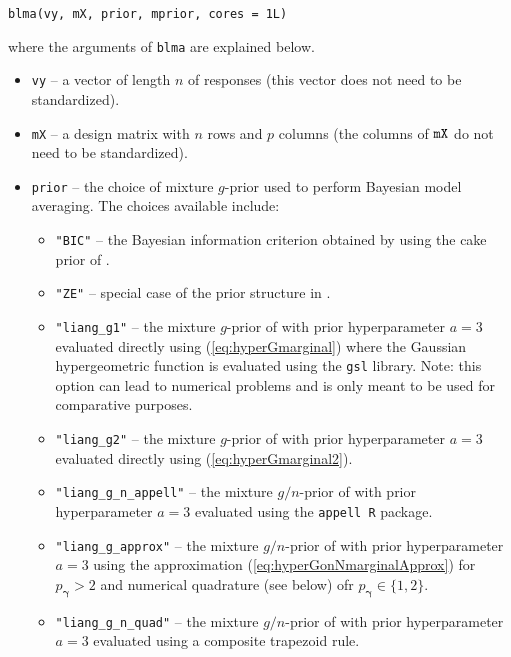\documentclass[12pt]{article}
\def\vectorfonttwo{\boldsymbol}
\def\vgamma{{\vectorfonttwo \gamma}}             %
\begin{document}
\begin{verbatim}
blma(vy, mX, prior, mprior, cores = 1L)
\end{verbatim}

\noindent where the arguments of {\tt blma}
are explained below.
\begin{itemize}
	\item {\tt vy} -- a vector of length $n$ of responses (this vector does not need to be standardized).
	
	\item {\tt mX} -- a design matrix with $n$ rows and $p$ columns (the columns of ${\tt mX}$ do not need to be standardized).
	
	\item {\tt prior} -- the choice of mixture $g$-prior used to perform Bayesian model averaging. The choices available include:
	\begin{itemize}
		\item {\tt "BIC"} -- the Bayesian information criterion obtained by using the cake prior 
		of \cite{OrmerodEtal2017}. 
		
		\item {\tt "ZE"} -- special case of the prior structure in \cite{Maruyama2011}.
		
		\item {\tt "liang\_g1"} -- the mixture $g$-prior of \cite{Liang2008} with prior hyperparameter $a=3$
		evaluated directly using (\ref{eq:hyperGmarginal}) where the Gaussian hypergeometric function is evaluated using the {\tt gsl} library. Note: this option can lead to numerical problems and is only meant to be used for comparative purposes.
		
		\item {\tt "liang\_g2"} -- the mixture $g$-prior of \cite{Liang2008} with prior hyperparameter $a=3$
		evaluated directly using (\ref{eq:hyperGmarginal2}).
		
		\item {\tt "liang\_g\_n\_appell"} -- the mixture $g/n$-prior of \cite{Liang2008} with prior hyperparameter $a=3$ evaluated using the {\tt appell R} package.
		
		\item {\tt "liang\_g\_approx"} -- the mixture $g/n$-prior of \cite{Liang2008} with prior hyperparameter $a=3$ using the approximation (\ref{eq:hyperGonNmarginalApprox}) for $p_\vgamma >2$ and
		numerical quadrature (see below) ofr $p_\vgamma\in \{1,2\}$.
		
		\item {\tt "liang\_g\_n\_quad"} -- the mixture $g/n$-prior of \cite{Liang2008} with prior hyperparameter $a=3$ evaluated using a composite trapezoid rule.
		

\end{itemize}
\end{itemize}
\end{document}
